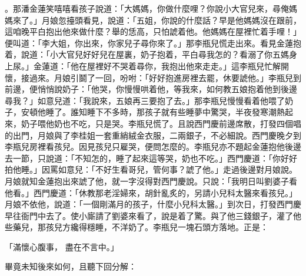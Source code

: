 。那潘金蓮笑嘻嘻看孩子說道：「大媽媽，你做什麼哩？你說小大官兒來，尋俺媽媽來了。」月娘忽擡頭看見，說道：「五姐，你說的什麼話？早是他媽媽沒在跟前，這咱晚平白抱出他來做什麼？舉的恁高，只怕諕着他。他媽媽在屋裡忙着手哩！」便叫道：「李大姐，你出來，你家兒子尋你來了。」那李瓶兒慌走出來。看見金蓮抱着，說道：「小大官兒好好兒在屋裏，奶子抱着，平白尋我怎的？看溺了你五媽身上尿。」金蓮道：「他在屋裡好不哭着尋你，我抱出他來走走。」這李瓶兒忙解開懷，接過來。月娘引鬬了一回，吩咐：「好好抱進房裡去罷，休要諕他。」李瓶兒到前邊，便悄悄說奶子：「他哭，你慢慢哄着他，等我來，如何教五娘抱着他到後邊尋我？」如意兒道：「我說來，五娘再三要抱了去。」那李瓶兒慢慢看着他喂了奶子，安頓他睡了。誰知睡下不多時，那孩子就有些睡夢中驚哭，半夜發寒潮熱起來，奶子喂他奶也不吃，只是哭。李瓶兒慌了。且說西門慶前邊席散，打發四個唱的出門，月娘與了李桂姐一套重綃絨金衣服，二兩銀子，不必細說。西門慶晚夕到李瓶兒房裡看孩兒。因見孩兒只雇哭，便問怎麼的。李瓶兒亦不題起金蓮抱他後邊去一節，只說道：「不知怎的，睡了起來這等哭，奶也不吃。」西門慶道：「你好好拍他睡。」因罵如意兒：「不好生看哥兒，管何事？諕了他。」走過後邊對月娘說。月娘就知金蓮抱出來諕了他，就一字沒得對西門慶說。只說：「我明日叫劉婆子看他看。」西門慶道：「休教那老淫婦來，胡針亂炙的，另請小兒科太醫來看孩兒。」月娘不依他，說道：「一個剛滿月的孩子，什麼小兒科太醫。」到次日，打發西門慶早往衙門中去了。使小廝請了劉婆來看了，說是着了驚。與了他三錢銀子，灌了他些藥兒，那孩兒方纔得穩睡，不洋奶了。李瓶兒一塊石頭方落地。正是：

「滿懷心腹事，  盡在不言中。」

畢竟未知後來如何，且聽下回分解：

